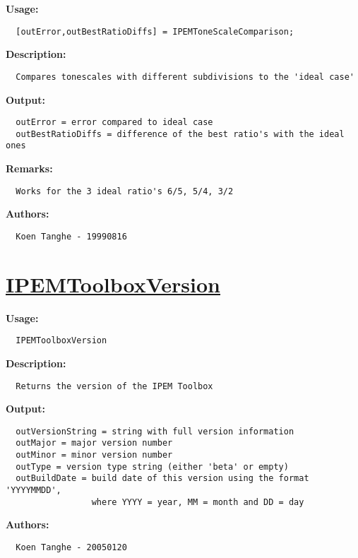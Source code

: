 \textbf{Usage:}
\begin{verbatim}  [outError,outBestRatioDiffs] = IPEMToneScaleComparison;

\end{verbatim}
\textbf{Description:}
\begin{verbatim}  Compares tonescales with different subdivisions to the 'ideal case'

\end{verbatim}
\textbf{Output:}
\begin{verbatim}  outError = error compared to ideal case
  outBestRatioDiffs = difference of the best ratio's with the ideal ones

\end{verbatim}
\textbf{Remarks:}
\begin{verbatim}  Works for the 3 ideal ratio's 6/5, 5/4, 3/2

\end{verbatim}
\textbf{Authors:}
\begin{verbatim}  Koen Tanghe - 19990816
\end{verbatim}


\newpage
\section*{\hyperlink{Concepts:IPEMToolboxVersion}{IPEMToolboxVersion}}
\hypertarget{FuncRef:IPEMToolboxVersion}{}

\textbf{Usage:}
\begin{verbatim}  IPEMToolboxVersion

\end{verbatim}
\textbf{Description:}
\begin{verbatim}  Returns the version of the IPEM Toolbox

\end{verbatim}
\textbf{Output:}
\begin{verbatim}  outVersionString = string with full version information
  outMajor = major version number
  outMinor = minor version number
  outType = version type string (either 'beta' or empty)
  outBuildDate = build date of this version using the format 'YYYYMMDD',
                 where YYYY = year, MM = month and DD = day

\end{verbatim}
\textbf{Authors:}
\begin{verbatim}  Koen Tanghe - 20050120
\end{verbatim}


